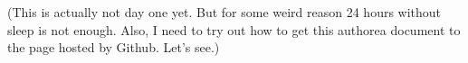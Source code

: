 
(This is actually not day one yet. But for some weird reason 24 hours without sleep is not enough. Also, I need to try out how to get this authorea document to the page hosted by Github. Let's see.)
